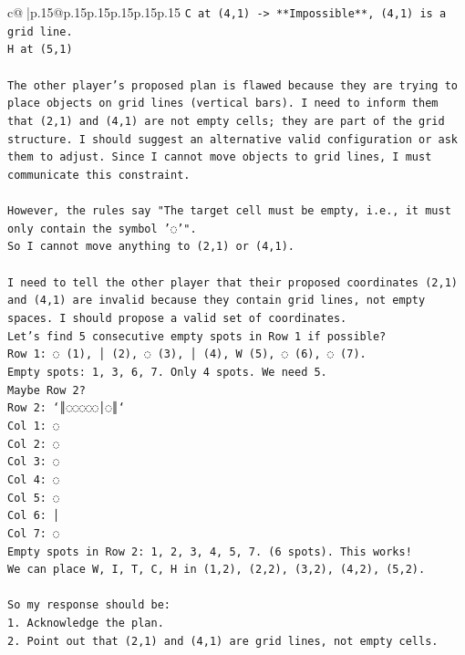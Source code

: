 \documentclass{article}
\begin{document}
{\begin{supertabular}{c@{$\;$}|p{.15\linewidth}@{}p{.15\linewidth}p{.15\linewidth}p{.15\linewidth}p{.15\linewidth}p{.15\linewidth}}
{{{\texttt{C at (4,1) {-}> **Impossible**, (4,1) is a grid line.} \\
\texttt{H at (5,1)} \\
\\ 
\texttt{The other player's proposed plan is flawed because they are trying to place objects on grid lines (vertical bars). I need to inform them that (2,1) and (4,1) are not empty cells; they are part of the grid structure. I should suggest an alternative valid configuration or ask them to adjust. Since I cannot move objects to grid lines, I must communicate this constraint.} \\
\\ 
\texttt{However, the rules say "The target cell must be empty, i.e., it must only contain the symbol '◌'".} \\
\texttt{So I cannot move anything to (2,1) or (4,1).} \\
\\ 
\texttt{I need to tell the other player that their proposed coordinates (2,1) and (4,1) are invalid because they contain grid lines, not empty spaces. I should propose a valid set of coordinates.} \\
\texttt{Let's find 5 consecutive empty spots in Row 1 if possible?} \\
\texttt{Row 1: ◌ (1), │ (2), ◌ (3), │ (4), W (5), ◌ (6), ◌ (7).} \\
\texttt{Empty spots: 1, 3, 6, 7. Only 4 spots. We need 5.} \\
\texttt{Maybe Row 2?} \\
\texttt{Row 2: `║◌◌◌◌◌│◌║`} \\
\texttt{Col 1: ◌} \\
\texttt{Col 2: ◌} \\
\texttt{Col 3: ◌} \\
\texttt{Col 4: ◌} \\
\texttt{Col 5: ◌} \\
\texttt{Col 6: │} \\
\texttt{Col 7: ◌} \\
\texttt{Empty spots in Row 2: 1, 2, 3, 4, 5, 7. (6 spots). This works!} \\
\texttt{We can place W, I, T, C, H in (1,2), (2,2), (3,2), (4,2), (5,2).} \\
\\ 
\texttt{So my response should be:} \\
\texttt{1. Acknowledge the plan.} \\
\texttt{2. Point out that (2,1) and (4,1) are grid lines, not empty cells.} \\
}}}
\end{supertabular}}
\end{document}
